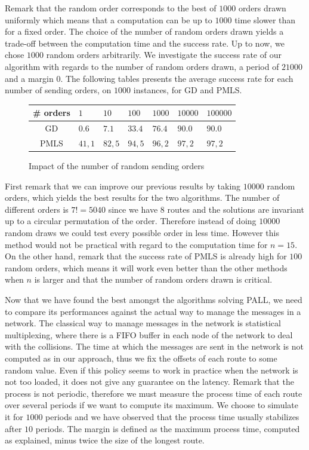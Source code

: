 \documentclass[10pt, conference, letterpaper]{IEEEtran}
\begin{document}
    Remark that the random order corresponds to the best of $1000$ orders drawn uniformly which means that a computation can be up to $1000$ time slower than for a fixed order. The choice of the number of random orders drawn yields a trade-off between the computation time and the success rate. Up to now, we chose $1000$ random orders arbitrarily. We investigate the success rate of our algorithm with regards to the number of random orders drawn, a period of $21000$ and a margin $0$. The following tables presents the average success rate for each number of sending orders, on $1000$ instances, for GD and PMLS.

         \begin{figure}[H] 
       \begin{center}
   \begin{tabularx}{0.5\textwidth}{|c|X|X|X|X|X|X|}
    \hline
    \# orders& $1$ & $10$ & $100$& $1 000$& $10 000$&$100 000$\\
    \hline
    GD & $0.6$ &$7.1$&$33.4$&$76.4$&$90.0$&$90.0$\\
    \hline
  PMLS & $41,1$ &$82,5$&$94,5$&$96,2$&$97,2$&$97,2$\\
    \hline
      \end{tabularx}
      \end{center}
   \caption{Impact of the number of random sending orders}
     \end{figure}
     
First remark that we can improve our previous results by taking $10000$ random orders, which 
yields the best results for the two algorithms. The number of different orders is $7!= 5040$ since we have $8$ routes and the solutions are invariant up to a circular permutation of the order. Therefore instead of doing $10000$ random draws we could test every possible order in less time. However this method would not be practical with regard to the computation time for $n = 15$. On the other hand, remark that the success rate of PMLS is already high for $100$ random orders, which means it will work even better than the other methods when $n$ is larger and that the number of random orders drawn is critical.
     
     
     
     Now that we have found the best amongst the algorithms solving PALL, we need to compare its performances against the actual way to manage the messages in a network. The classical way to manage messages in the network is statistical multiplexing, where there is a FIFO buffer in each node of the network to deal with the collisions. The time at which the messages are sent in the network is not computed as in our approach, thus we fix the offsets of each route to some random value.
     Even if this policy seems to work in practice when the network is not too loaded, it does not give any guarantee on the latency. Remark that the process is not periodic, therefore we must measure the process time of each route over several periods if we want to compute its maximum. We choose to simulate it for $1000$ periods and we have observed that the process time usually stabilizes after $10$ periods. The margin is defined as the maximum process time, computed as explained, minus twice the size of the longest route. 
	    
\end{document}
